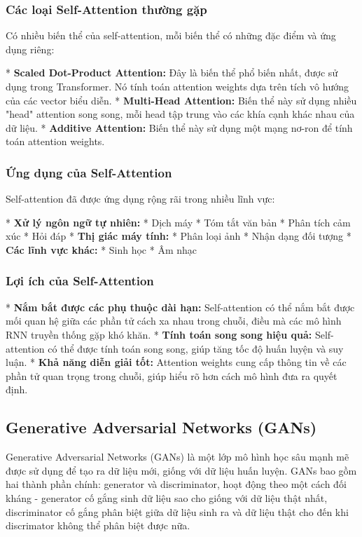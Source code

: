 \subsubsection{Các loại Self-Attention thường gặp}

Có nhiều biến thể của self-attention, mỗi biến thể có những đặc điểm và ứng dụng riêng:

* \textbf{Scaled Dot-Product Attention:} Đây là biến thể phổ biến nhất, được sử dụng trong Transformer. Nó tính toán attention weights dựa trên tích vô hướng của các vector biểu diễn.
* \textbf{Multi-Head Attention:}  Biến thể này sử dụng nhiều "head" attention song song, mỗi head tập trung vào các khía cạnh khác nhau của dữ liệu.
* \textbf{Additive Attention:} Biến thể này sử dụng một mạng nơ-ron để tính toán attention weights.

\subsubsection{Ứng dụng của Self-Attention}

Self-attention đã được ứng dụng rộng rãi trong nhiều lĩnh vực:

* \textbf{Xử lý ngôn ngữ tự nhiên:} 
    * Dịch máy
    * Tóm tắt văn bản
    * Phân tích cảm xúc
    * Hỏi đáp
* \textbf{Thị giác máy tính:}
    * Phân loại ảnh
    * Nhận dạng đối tượng
* \textbf{Các lĩnh vực khác:}
    * Sinh học
    * Âm nhạc

\subsubsection{Lợi ích của Self-Attention}

* \textbf{Nắm bắt được các phụ thuộc dài hạn:} Self-attention có thể nắm bắt được mối quan hệ giữa các phần tử cách xa nhau trong chuỗi, điều mà các mô hình RNN truyền thống gặp khó khăn.
* \textbf{Tính toán song song hiệu quả:} Self-attention có thể được tính toán song song, giúp tăng tốc độ huấn luyện và suy luận.
* \textbf{Khả năng diễn giải tốt:} Attention weights cung cấp thông tin về các phần tử quan trọng trong chuỗi, giúp hiểu rõ hơn cách mô hình đưa ra quyết định.

\subsection{Generative Adversarial Networks (GANs)}

Generative Adversarial Networks (GANs) là một lớp mô hình học sâu mạnh mẽ được sử dụng để tạo ra dữ liệu mới, giống với dữ liệu huấn luyện. GANs bao gồm hai thành phần chính: generator và discriminator, hoạt động theo một cách đối kháng - generator cố gắng sinh dữ liệu sao cho giống với dữ liệu thật nhất, discriminator cố gắng phân biệt giữa dữ liệu sinh ra và dữ liệu thật cho đến khi discrimator không thể phân biệt được nữa.

